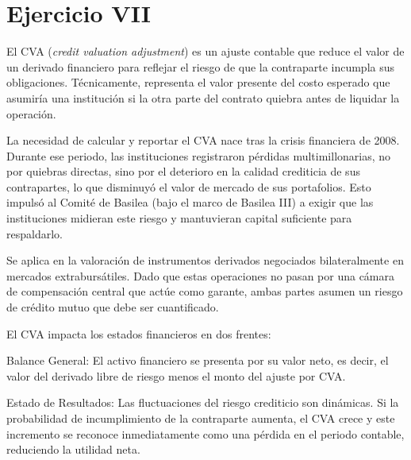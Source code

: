 \section{Ejercicio VII}

El CVA (\textit{credit valuation adjustment}) es un ajuste contable que reduce el valor de un derivado financiero para reflejar el riesgo de que la contraparte incumpla sus obligaciones. Técnicamente, representa el valor presente del costo esperado que asumiría una institución si la otra parte del contrato quiebra antes de liquidar la operación.

La necesidad de calcular y reportar el CVA nace tras la crisis financiera de 2008. Durante ese periodo, las instituciones registraron pérdidas multimillonarias, no por quiebras directas, sino por el deterioro en la calidad crediticia de sus contrapartes, lo que disminuyó el valor de mercado de sus portafolios. Esto impulsó al Comité de Basilea (bajo el marco de Basilea III) a exigir que las instituciones midieran este riesgo y mantuvieran capital suficiente para respaldarlo.

Se aplica en la valoración de instrumentos derivados negociados bilateralmente en mercados extrabursátiles. Dado que estas operaciones no pasan por una cámara de compensación central que actúe como garante, ambas partes asumen un riesgo de crédito mutuo que debe ser cuantificado.

El CVA impacta los estados financieros en dos frentes:

Balance General: El activo financiero se presenta por su valor neto, es decir, el valor del derivado libre de riesgo menos el monto del ajuste por CVA.

Estado de Resultados: Las fluctuaciones del riesgo crediticio son dinámicas. Si la probabilidad de incumplimiento de la contraparte aumenta, el CVA crece y este incremento se reconoce inmediatamente como una pérdida en el periodo contable, reduciendo la utilidad neta.